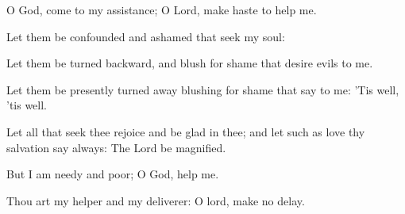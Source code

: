 \item O God, come to my assistance; O Lord, make haste to help me.
\item Let them be confounded and ashamed that seek my soul:
\item Let them be turned backward, and blush for shame that desire evils to me.
\item Let them be presently turned away blushing for shame that say to me: 'Tis well, 'tis well.
\item Let all that seek thee rejoice and be glad in thee; and let such as love thy salvation say always: The Lord be magnified.
\item But I am needy and poor; O God, help me.
\item Thou art my helper and my deliverer: O lord, make no delay.
